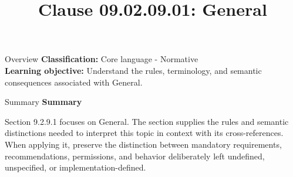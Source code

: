\documentclass[10pt,letterpaper]{article}
\title{Clause 09.02.09.01: General}
\author{}
\date{}
\begin{document}
\maketitle
\begin{CornellOverviewBox}{Overview}
\textbf{Classification:} Core language - Normative\\[2pt]
\textbf{Learning objective:} Understand the rules, terminology, and semantic consequences associated with General.
\end{CornellOverviewBox}\begin{CornellSummaryBox}{Summary}
{\sffamily\bfseries\color{Accent} Summary}\par\vspace{3pt}Section 9.2.9.1 focuses on General. The section supplies the rules and semantic distinctions needed to interpret this topic in context with its cross-references. When applying it, preserve the distinction between mandatory requirements, recommendations, permissions, and behavior deliberately left undefined, unspecified, or implementation-defined.
\end{CornellSummaryBox}
\end{document}

